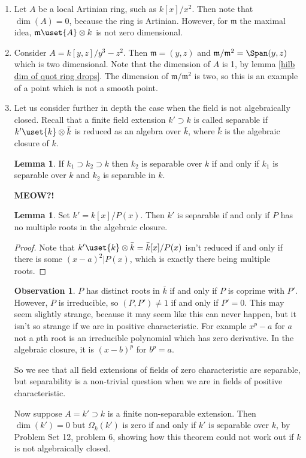 \documentclass[12 pt]{article}
\theoremstyle{definition}
\newtheorem{lemma}[thm]{Lemma}
\newtheorem{obs}[thm]{Observation}
\renewcommand{\(}{\left(}
\renewcommand{\)}{\right)}
\newcommand\fm{{\mathfrak m}}
\begin{document}
\begin{enumerate}
\item Let $A$ be a local Artinian ring, such as $k[x]/x^2$. Then note that $\dim(A)=0$, because the ring is Artinian. However, for $\fm$ the maximal idea, $\fm \uset{A}\otimes k$ is not zero dimensional.

\item Consider $A=k[y,z]/y^3-z^2$. Then $\fm=(y,z)$ and $\fm/\fm^2=\Span(y,z)$ which is two dimensional. Note that the dimension of $A$ is 1, by
    lemma \ref{hilb dim of quot ring drops}. The dimension of $\fm/\fm^2$ is two, so this is an example of a point which is not a smooth point.

\item Let us consider further in depth the case when the field is not algebraically closed. Recall that a finite field extension $k' \supset k$ is called separable if $k' \uset{k} \otimes \bar{k}$ is reduced as an algebra over $\bar{k}$, where $\bar{k}$ is the algebraic closure of $k$.

    \begin{lemma} If $k_1 \supset k_2 \supset k$ then $k_2$ is separable over $k$ if and only if $k_1$ is separable over $k$ and $k_2$ is separable in $k$.
    \end{lemma}
    \textcolor[rgb]{0.98,0.00,0.00}{\textbf{MEOW?!}}

    \begin{lemma} Set $k'=k[x]/P(x)$. Then $k'$ is separable if and only if $P$ has no multiple roots in the algebraic closure.
    \end{lemma}
    \begin{proof} Note that $k' \uset{k}\otimes \bar{k}=\bar{k}[x]/P(x)$ isn't reduced if and only if there is some $(x-a)^2|P(x)$, which is exactly there being multiple roots.
    \end{proof}

    \begin{obs} $P$ has distinct roots in $\bar{k}$ if and only if $P$ is coprime with $P'$. However, $P$ is irreducible, so $(P,P') \neq 1$ if and only if $P'=0$. This may seem slightly strange, because it may seem like this can never happen, but it isn't so strange if we are in positive characteristic. For example $x^p-a$ for $a$ not a $p$th root is an irreducible polynomial which has zero derivative. In the algebraic closure, it is $(x-b)^p$ for $b^p=a$.

    So we see that all field extensions of fields of zero characteristic are separable, but separability is a non-trivial question when we are in fields of positive characteristic.
    \end{obs}

    Now suppose $A=k' \supset k$ is a finite non-separable extension. Then $\dim(k')=0$ but $\Omega_k(k')$ is zero if and only if $k'$ is separable over $k$, by Problem Set 12, problem 6, showing how this theorem could not work out if $k$ is not algebraically closed.
\end{enumerate}
\end{document}
